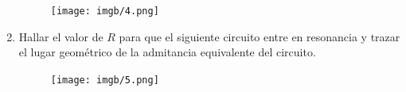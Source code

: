 \documentclass[10pt,a4paper]{article}
\begin{document}
\begin{enumerate}
\begin{figure}[H]
	\centering
	\texttt{[image: imgb/4.png]}
	\label{e17}
\end{figure}
\item  Hallar el valor de $R$ para que el siguiente circuito entre en resonancia y trazar el lugar geométrico de la admitancia equivalente del circuito.

\begin{figure}[H]
	\centering
	\texttt{[image: imgb/5.png]}
	\label{e18}
\end{figure}


    
\end{enumerate}
    
\end{document}
